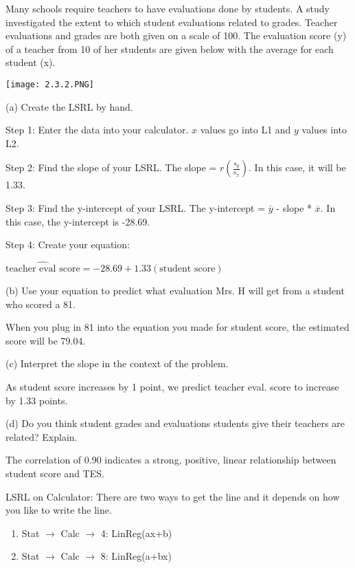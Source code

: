 \documentclass[../stats.tex]{subfiles}
\begin{document}
\pagebreak
\begin{example}
    Many schools require teachers to have evaluations done by students. A study investigated the extent to which student evaluations related to grades. Teacher evaluations and grades are both given on a scale of 100. The evaluation score (y) of a teacher from 10 of her students are given below with the average for each student (x).
    \begin{center}
        \texttt{[image: 2.3.2.PNG]}
    \end{center}
    (a) Create the LSRL by hand.

    Step 1: Enter the data into your calculator. $x$ values go into L1 and $y$ values into L2.

    Step 2: Find the slope of your LSRL. The slope = $r\left(\frac{s_y}{s_x}\right)$. In this case, it will be 1.33.

    Step 3: Find the y-intercept of your LSRL. The y-intercept = $\overline{y}$ - slope * $\overline{x}$. In this case, the y-intercept is -28.69.

    Step 4: Create your equation: 

    $\hat{\text{teacher eval score}} = -28.69+1.33(\text{student score})$

    (b) Use your equation to predict what evaluation Mrs. H will get from a student who scored a 81.

    When you plug in 81 into the equation you made for student score, the estimated score will be 79.04.

    (c) Interpret the slope in the context of the problem.

    As student score increases by 1 point, we predict teacher eval. score to increase by 1.33 points.

    (d) Do you think student grades and evaluations students give their teachers are related? Explain.

    The correlation of 0.90 indicates a strong, positive, linear relationship between student score and TES.
\end{example}
LSRL on Calculator: There are two ways to get the line and it depends on how you like to write the line.
\begin{enumerate}
    \item Stat $\rightarrow$ Calc $\rightarrow$ 4: LinReg(ax+b)
    \item Stat $\rightarrow$ Calc $\rightarrow$ 8: LinReg(a+bx)
\end{enumerate}
\end{document}
